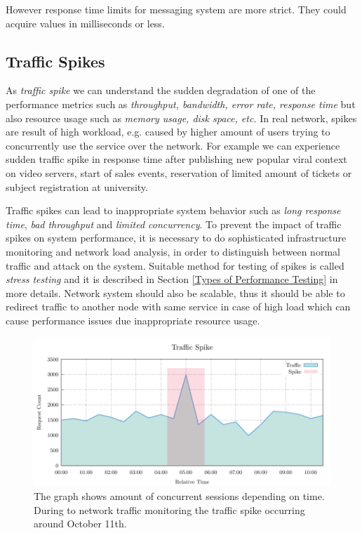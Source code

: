 However response time limits for messaging system are more strict. They could acquire values in milliseconds or less.


\subsection*{Traffic Spikes}
As \emph{traffic spike} \cite{Kurkova:Thesis:2017, AMC:SPIKES} we can understand the sudden degradation of one of the performance metrics such as \emph{throughput, bandwidth, error rate, response time} but also resource usage such as \emph{memory usage, disk space, etc.} In real network, spikes are result of high workload, e.g. caused by higher amount of users trying to concurrently use the service over the network. For example we can experience sudden traffic spike in response time after publishing new popular viral context on video servers, start of sales events, reservation of limited amount of tickets or subject registration at university.

Traffic spikes can lead to inappropriate system behavior such as \emph{long response time}, \emph{bad throughput} and \emph{limited concurrency}. To prevent the impact of traffic spikes on system performance, it is  necessary to do sophisticated infrastructure monitoring and network load analysis, in order to distinguish between normal traffic and attack on the system. Suitable method for testing of spikes is called \emph{stress testing} \cite{Manzor:APTB} and it is described in Section \ref{Types of Performance Testing} in more details. Network system should also be scalable, thus it should be able to redirect traffic to another node with same service in case of high load which can cause performance issues due inappropriate resource usage.

\begin{figure}[H]
  \centering
  \includegraphics[width=14cm]{obrazky-figures/traffic_spike.pdf}
  \caption{The graph shows amount of concurrent sessions depending on time. During to network traffic monitoring the traffic spike occurring around October 11th.}
  \label{fig:spikes}
\end{figure}

